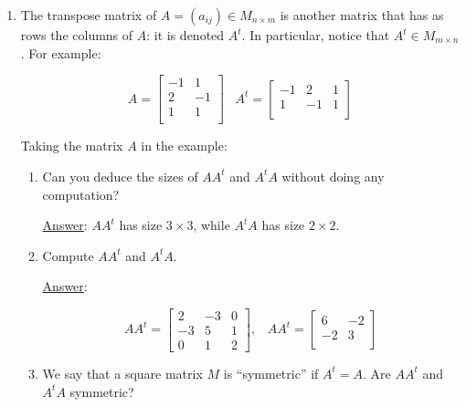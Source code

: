 \documentclass[]{book}
\theoremstyle{definition}
\newcommand{\bb}[1]{\mathbb{#1}}
\newcommand{\R}{\bb{R}}
\newcommand\ans{\underline{Answer}: }
\begin{document}
\begin{enumerate}
\begin{enumerate}
\item Give a basis of the vector subspace $S\subset \R^3$ generated by $f(e_1), f(e_2), f(e_3)$.

\ans Since $\textrm{rank}(A) = 2$ the columns of $A$ do not form a linearly independent set., but two 
of them -- not necessarily any two of them -- can. In this case $f(e_1)$, $f(e_2)$ generate $S$ and are 
linearly independent, consequently they are a basis of $S$.
\end{enumerate} 



\item
The transpose matrix of $A=(a_{ij}) \in M_{n\times m}$ is another matrix that has as rows the columns of $A$: it is denoted $A^t$. In particular, notice that $A^t \in M_{m\times n}$. For example:

\[
   A=
  \left[ {\begin{array}{cc}
   -1 & 1 \\
   2 & -1 \\
   1 & 1 \\
  \end{array} } \right]
\;\;\;
  A^t=
  \left[ {\begin{array}{ccc}
   -1 & 2 & 1 \\
   1 & -1 & 1 \\
  \end{array} } \right]
\]


Taking the matrix $A$ in the example:
\begin{enumerate}
\item Can you deduce the sizes of $AA^t$ and $A^tA$ without doing any computation?

\ans $AA^t$ has size $3\times 3$, while $A^tA$ has size $2\times 2$.

\item Compute $AA^t$ and $A^tA$.

\ans 

\[
AA^t = 
  \begin{bmatrix}
  2 & -3  & 0 \\
  -3 & 5  & 1 \\
  0 & 1 & 2 
  \end{bmatrix},
\;\;\;
AA^t = 
  \begin{bmatrix}
  6 & -2 \\
  -2  & 3 \\ 
  \end{bmatrix}
\]

\item We say that a square matrix $M$ is ``symmetric'' if $A^t = A$. Are $AA^t$ and $A^tA$ symmetric?


\end{enumerate}
\end{enumerate}
\end{document}
